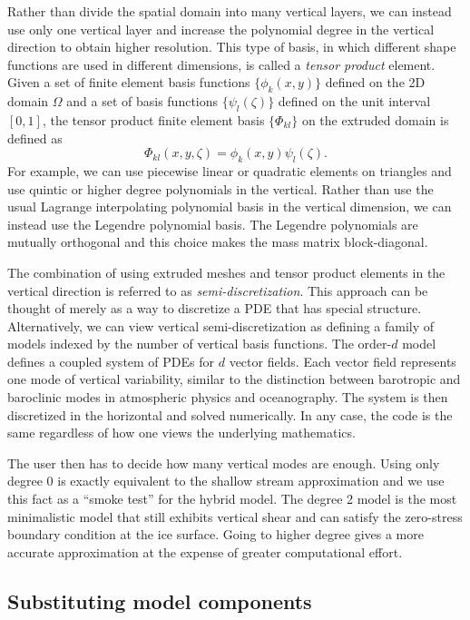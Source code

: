 \documentclass[journal abbreviation, manuscript]{copernicus}
\begin{document}
Rather than divide the spatial domain into many vertical layers, we can instead use only one vertical layer and increase the polynomial degree in the vertical direction to obtain higher resolution.
This type of basis, in which different shape functions are used in different dimensions, is called a \emph{tensor product} element.
Given a set of finite element basis functions $\{\phi_k(x, y)\}$ defined on the 2D domain $\Omega$ and a set of basis functions $\{\psi_l(\zeta)\}$ defined on the unit interval $[0, 1]$, the tensor product finite element basis $\{\Phi_{kl}\}$ on the extruded domain is defined as
\begin{equation}
    \Phi_{kl}(x, y, \zeta) = \phi_k(x, y)\psi_l(\zeta).
\end{equation}
For example, we can use piecewise linear or quadratic elements on triangles and use quintic or higher degree polynomials in the vertical.
Rather than use the usual Lagrange interpolating polynomial basis in the vertical dimension, we can instead use the Legendre polynomial basis.
The Legendre polynomials are mutually orthogonal and this choice makes the mass matrix block-diagonal.

The combination of using extruded meshes and tensor product elements in the vertical direction is referred to as \emph{semi-discretization}.
This approach can be thought of merely as a way to discretize a PDE that has special structure.
Alternatively, we can view vertical semi-discretization as defining a family of models indexed by the number of vertical basis functions.
The order-$d$ model defines a coupled system of PDEs for $d$ vector fields.
Each vector field represents one mode of vertical variability, similar to the distinction between barotropic and baroclinic modes in atmospheric physics and oceanography.
The system is then discretized in the horizontal and solved numerically.
In any case, the code is the same regardless of how one views the underlying mathematics.

The user then has to decide how many vertical modes are enough.
Using only degree 0 is exactly equivalent to the shallow stream approximation and we use this fact as a ``smoke test'' for the hybrid model.
The degree 2 model is the most minimalistic model that still exhibits vertical shear and can satisfy the zero-stress boundary condition at the ice surface.
Going to higher degree gives a more accurate approximation at the expense of greater computational effort.

\subsection{Substituting model components} \label{sec:physics-substitution}
\end{document}
